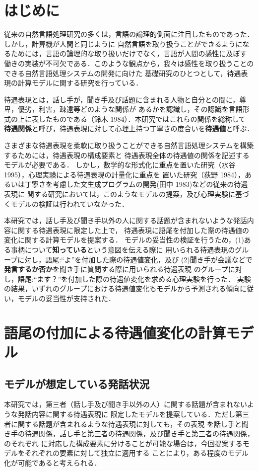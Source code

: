 \maketitle
\section{はじめに}
従来の自然言語処理研究の多くは，言語の論理的側面に注目したものであった．しかし，計算機が人間と同じように
自然言語を取り扱うことができるようになるためには，言語の論理的な取り扱いだけでなく，言語が人間の感性に及ぼす
働きの実装が不可欠である．このような観点から，我々は感性を取り扱うことのできる自然言語処理システムの開発に向けた
基礎研究のひとつとして，待遇表現の計算モデルに関する研究を行っている．

待遇表現とは，話し手が，聞き手及び話題に含まれる人物と自分との間に，尊卑，優劣，利害，疎遠等どのような関係が
あるかを認識し，その認識を言語形式の上に表したものである（鈴木 1984）．本研究ではこれらの関係を総称して
{\bf 待遇関係}と呼び，待遇表現に対して心理上持つ丁寧さの度合いを{\bf 待遇値}と呼ぶ．

さまざまな待遇表現を柔軟に取り扱うことができる自然言語処理システムを構築するためには，待遇表現の構成要素と
待遇表現全体の待遇値の関係を記述するモデルが必要である．
しかし，数学的な形式化に重点を置いた研究（水谷 1995），心理実験による待遇表現の計量化に重点を
置いた研究（荻野 1984），あるいは丁寧さを考慮した文生成プログラムの開発(田中 1983)などの従来の待遇表現に
関する研究においては，このようなモデルの提案，及び心理実験に基づくモデルの検証は行われていなかった．

本研究では，話し手及び聞き手以外の人に関する話題が含まれないような発話内容に関する待遇表現に限定した上で，
待遇表現に語尾を付加した際の待遇値の変化に関する計算モデルを提案する．
モデルの妥当性の検証を行うため，(1)ある事柄について{\bf 知っている}という意図を伝える際に
用いられる待遇表現のグループに対し，語尾:``よ''を付加した際の待遇値変化，及び
(2)聞き手が会議などで{\bf 発言するか否か}を聞き手に質問する際に用いられる待遇表現
のグループに対し，語尾:``ます？''を付加した際の待遇値変化を求める心理実験を行った．
実験の結果，いずれのグループにおける待遇値変化もモデルから予測される傾向に従い，モデルの妥当性が支持された．
\section{語尾の付加による待遇値変化の計算モデル}
\subsection{モデルが想定している発話状況}
本研究では，第三者（話し手及び聞き手以外の人）に関する話題が含まれないような発話内容に関する待遇表現に
限定したモデルを提案している．ただし第三者に関する話題が含まれるような待遇表現に対しても，その表現
を話し手と聞き手の待遇関係，話し手と第三者の待遇関係，及び聞き手と第三者の待遇関係，のそれぞれ
に対応した構成要素に分けることが可能な場合は，今回提案するモデルをそれぞれの要素に対して独立に適用する
ことにより，ある程度のモデル化が可能であると考えられる．

